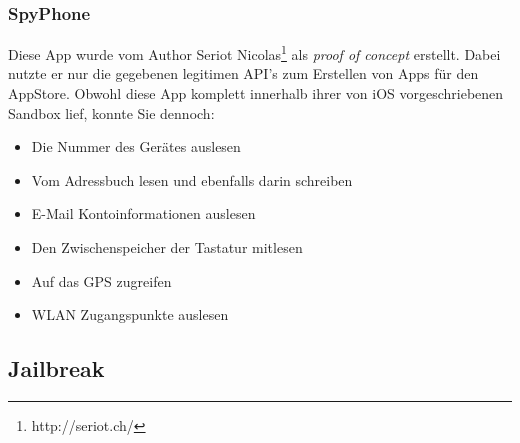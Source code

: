 		\subsubsection{SpyPhone}
			Diese App wurde vom Author Seriot Nicolas\footnote{http://seriot.ch/} als
			\textsl{proof of concept} erstellt. Dabei nutzte er nur die gegebenen
			legitimen API's zum Erstellen von Apps für den AppStore. Obwohl diese App
			komplett innerhalb ihrer von iOS vorgeschriebenen Sandbox lief, konnte
			Sie dennoch:
			\begin{itemize}\itemsep0pt
				\item{Die Nummer des Gerätes auslesen}
				\item{Vom Adressbuch lesen und ebenfalls darin schreiben}
				\item{E-Mail Kontoinformationen auslesen}
				\item{Den Zwischenspeicher der Tastatur mitlesen}
				\item{Auf das GPS zugreifen}
				\item{WLAN Zugangspunkte auslesen}
			\end{itemize}
	\subsection{Jailbreak}

